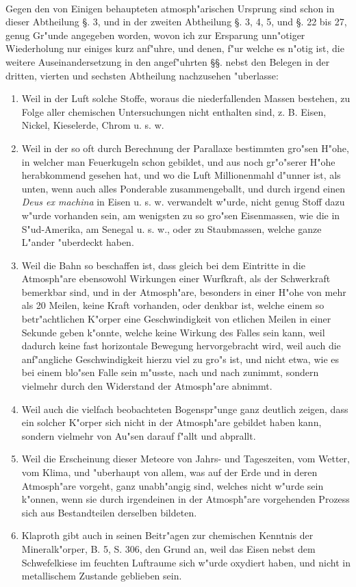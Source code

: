 \documentclass[a4paper, 11pt, oneside, polutonikogreek, german]{article}
\begin{document}
\paragraph{}
Gegen den von Einigen behaupteten atmosph"arischen Ursprung sind schon in dieser Abtheilung §. 3, und in der zweiten Abtheilung §. 3, 4, 5, und §. 22 bis 27, genug Gr"unde angegeben worden, wovon ich zur Ersparung unn"otiger Wiederholung nur einiges kurz anf"uhre, und denen, f"ur welche es n"otig ist, die weitere Auseinandersetzung in den angef"uhrten §§. nebst den Belegen in der dritten, vierten und sechsten Abtheilung nachzusehen "uberlasse:
\begin{enumerate}
    \item Weil in der Luft solche Stoffe, woraus die niederfallenden Massen bestehen, zu Folge aller chemischen Untersuchungen nicht enthalten sind, z. B. Eisen, Nickel, Kieselerde, Chrom u. s. w.
    \item Weil in der so oft durch Berechnung der Parallaxe bestimmten gro"sen H"ohe, in welcher man Feuerkugeln schon gebildet, und aus noch gr"o"serer H"ohe herabkommend gesehen hat, und wo die Luft Millionenmahl d"unner ist, als unten, wenn auch alles Ponderable zusammengeballt, und durch irgend einen \emph{Deus ex machina} in Eisen u. s. w. verwandelt w"urde, nicht genug Stoff dazu w"urde vorhanden sein, am wenigsten zu so gro"sen Eisenmassen, wie die in S"ud-Amerika, am Senegal u. s. w., oder zu Staubmassen, welche ganze L"ander "uberdeckt haben.
    \item Weil die Bahn so beschaffen ist, dass gleich bei dem Eintritte in die Atmosph"are ebensowohl Wirkungen einer Wurfkraft, als der Schwerkraft bemerkbar sind, und in der Atmosph"are, besonders in einer H"ohe von mehr als 20 Meilen, keine Kraft vorhanden, oder denkbar ist, welche einem so betr"achtlichen K"orper eine Geschwindigkeit von etlichen Meilen in einer Sekunde geben k"onnte, welche keine Wirkung des Falles sein kann, weil dadurch keine fast horizontale Bewegung hervorgebracht wird, weil auch die anf"angliche Geschwindigkeit hierzu viel zu gro"s ist, und nicht etwa, wie es bei einem blo"sen Falle sein m"usste, nach und nach zunimmt, sondern vielmehr durch den Widerstand der Atmosph"are abnimmt.
    \item Weil auch die vielfach beobachteten Bogenspr"unge ganz deutlich zeigen, dass ein solcher K"orper sich nicht in der Atmosph"are gebildet haben kann, sondern vielmehr von Au"sen darauf f"allt und abprallt.
    \item Weil die Erscheinung dieser Meteore von Jahrs- und Tageszeiten, vom Wetter, vom Klima, und "uberhaupt von allem, was auf der Erde und in deren Atmosph"are vorgeht, ganz unabh"angig sind, welches nicht w"urde sein k"onnen, wenn sie durch irgendeinen in der Atmosph"are vorgehenden Prozess sich aus Bestandteilen derselben bildeten.
    \item Klaproth gibt auch in seinen Beitr"agen zur chemischen Kenntnis der Mineralk"orper, B. 5, S. 306, den Grund an, weil das Eisen nebst dem Schwefelkiese im feuchten Luftraume sich w"urde oxydiert haben, und nicht in metallischem Zustande geblieben sein.
\end{enumerate}
\end{document}
